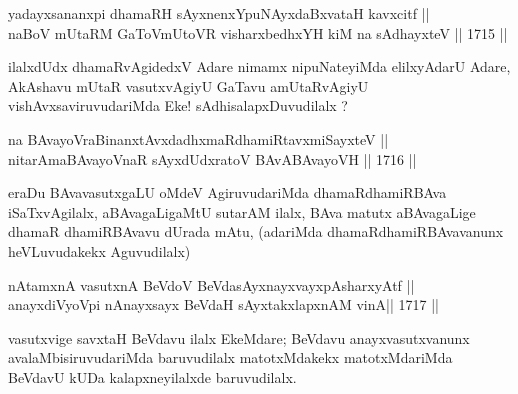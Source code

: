 
\begin{shl}
yadayxsananxpi dhamaRH sAyxnenxYpuNAyxdaBxvataH kavxcitf || \\
naBoV mUtaRM GaToV\s mUtoVR visharxbedhxYH kiM na sAdhayxteV \hfill || 1715 ||  
\end{shl}

\begin{artha}
ilalxdUdx dhamaRvAgidedxV Adare nimamx nipuNateyiMda elilxyAdarU Adare,
AkAshavu mUtaR vasutxvAgiyU GaTavu amUtaRvAgiyU vishAvxsaviruvudariMda
Eke! sAdhisalapxDuvudilalx ?
\end{artha}


\begin{shl}
na BAvayoVraBinanxtAvxdadhxmaRdhamiRtavxmiSayxteV ||  \\
nitarAmaBAvayoVnaR sAyxdUdxratoV BAvABAvayoVH \hfill || 1716 ||
\end{shl}

\begin{artha}
eraDu BAvavasutxgaLU oMdeV AgiruvudariMda dhamaRdhamiRBAva
iSaTxvAgilalx, aBAvagaLigaMtU sutarAM ilalx, BAva matutx aBAvagaLige
dhamaR dhamiRBAvavu dUrada mAtu, (adariMda dhamaRdhamiRBAvavanunx
heVLuvudakekx Aguvudilalx)
\end{artha}

\begin{shl}
nA\s \s tamxnA vasutxnA BeVdoV BeVdasAyxnayxvayxpAsharxyAtf || \\
anayxdiVyoV\s pi nAnayxsayx BeVdaH sAyxtakxlapxnAM vinA\footnotemark[1] \hfill || 1717 ||  
\end{shl}

\begin{artha}
vasutxvige savxtaH BeVdavu ilalx EkeMdare; BeVdavu
anayxvasutxvanunx avalaMbisiruvudariMda baruvudilalx matotxMdakekx
matotxMdariMda BeVdavU kUDa kalapxneyilalxde baruvudilalx.
\end{artha}

